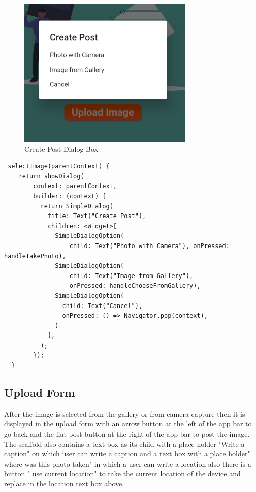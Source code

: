 \begin{figure}[!htb]
    \centering
    \includegraphics[scale=0.90]{AppScreenShots/create post dialog.PNG}
    \caption{Create Post Dialog Box}
    \label{fig:Create Post Dialog Box}
\end{figure}
\begin{verbatim}
 selectImage(parentContext) {
    return showDialog(
        context: parentContext,
        builder: (context) {
          return SimpleDialog(
            title: Text("Create Post"),
            children: <Widget>[
              SimpleDialogOption(
                  child: Text("Photo with Camera"), onPressed: handleTakePhoto),
              SimpleDialogOption(
                  child: Text("Image from Gallery"),
                  onPressed: handleChooseFromGallery),
              SimpleDialogOption(
                child: Text("Cancel"),
                onPressed: () => Navigator.pop(context),
              )
            ],
          );
        });
  }
\end{verbatim}

\subsection{Upload Form}
After the image is selected from the gallery or from camera capture then it is displayed in the upload form with an arrow button at the left of the app bar to go back and the flat post button at the right of the app bar to post the image. The scaffold also contains a text box as its child with a place holder "Write a caption" on which user can write a caption and a text box with a place holder" where was this photo taken" in which a user can write a location also there is a button " use current location" to take the current location of the device and replace in the location text box above.

